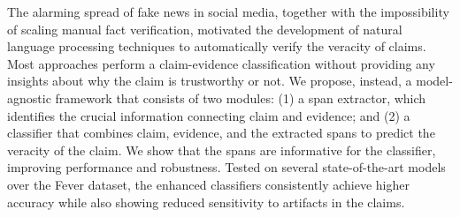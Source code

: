 The alarming spread of fake news in social media, together with the impossibility of scaling manual fact verification, motivated the development of natural language processing techniques to automatically verify the veracity of claims. Most approaches perform a claim-evidence classification without providing any insights about why the claim is trustworthy or not. We propose, instead, a model-agnostic framework that consists of two modules: (1) a span extractor, which identifies the crucial information connecting claim and evidence; and (2) a classifier that combines claim, evidence, and the extracted spans to predict the veracity of the claim. We show that the spans are informative for the classifier, improving performance and robustness. Tested on several state-of-the-art models over the Fever dataset, the enhanced classifiers consistently achieve higher accuracy while also showing reduced sensitivity to artifacts in the claims.
